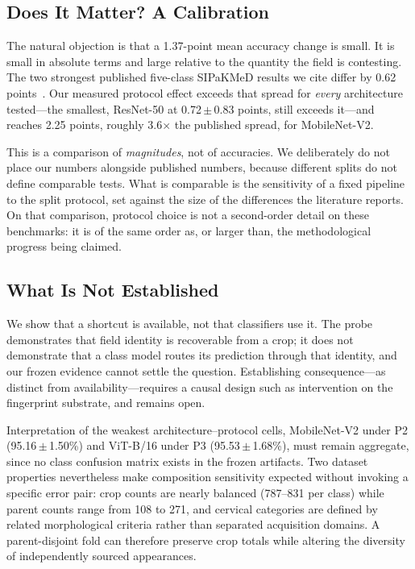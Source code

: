 \documentclass[conference]{IEEEtran}
\newcommand{\meanpm}[2]{#1\,$\pm$\,#2}
\newcommand{\protocol}[1]{\textsf{#1}}
\begin{document}
\subsection{Does It Matter? A Calibration}
The natural objection is that a 1.37-point mean accuracy change is small.
It is small in absolute terms and large relative to the quantity the field is contesting.
The two strongest published five-class SIPaKMeD results we cite differ by 0.62 points~\cite{rahaman2021deepcervix,gao2022knowledge}.
Our measured protocol effect exceeds that spread for \emph{every} architecture tested---the smallest, ResNet-50 at \meanpm{0.72}{0.83} points, still exceeds it---and reaches 2.25 points, roughly 3.6$\times$ the published spread, for MobileNet-V2.

This is a comparison of \emph{magnitudes}, not of accuracies.
We deliberately do not place our numbers alongside published numbers, because different splits do not define comparable tests.
What is comparable is the sensitivity of a fixed pipeline to the split protocol, set against the size of the differences the literature reports.
On that comparison, protocol choice is not a second-order detail on these benchmarks: it is of the same order as, or larger than, the methodological progress being claimed.

\subsection{What Is Not Established}
We show that a shortcut is available, not that classifiers use it.
The probe demonstrates that field identity is recoverable from a crop; it does not demonstrate that a class model routes its prediction through that identity, and our frozen evidence cannot settle the question.
Establishing consequence---as distinct from availability---requires a causal design such as intervention on the fingerprint substrate, and remains open.

Interpretation of the weakest architecture--protocol cells, MobileNet-V2 under \protocol{P2} (\meanpm{95.16}{1.50}\%) and ViT-B/16 under \protocol{P3} (\meanpm{95.53}{1.68}\%), must remain aggregate, since no class confusion matrix exists in the frozen artifacts.
Two dataset properties nevertheless make composition sensitivity expected without invoking a specific error pair: crop counts are nearly balanced (787--831 per class) while parent counts range from 108 to 271, and cervical categories are defined by related morphological criteria rather than separated acquisition domains.
A parent-disjoint fold can therefore preserve crop totals while altering the diversity of independently sourced appearances.
\end{document}
